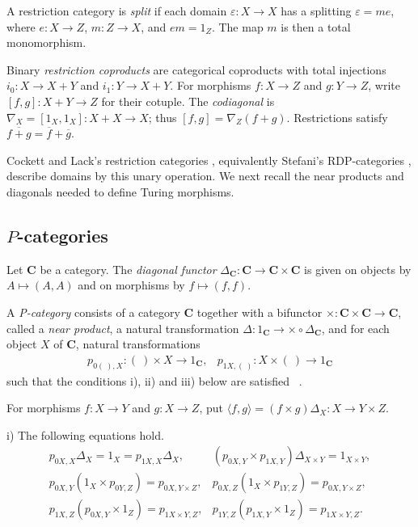 \documentclass[letterpaper,10pt]{amsart}
\theoremstyle{plain}
\theoremstyle{definition}
\newcommand{\MAP}[3]{{#1}:{#2}\rightarrow{#3}}
\newcommand{\sento}[2]{{#1}\mapsto{#2}}
\newcommand{\rst}[1]{\overline{#1}}
\begin{document}
A restriction category is \textit{split} if each domain
$\varepsilon:X\to X$ has a splitting $\varepsilon=me$, where
$e:X\to Z$, $m:Z\to X$, and $em=1_Z$. The map $m$ is then a
total monomorphism.

Binary \textit{restriction coproducts} are categorical coproducts with
total injections $i_0:X\to X+Y$ and $i_1:Y\to X+Y$. For morphisms
$f:X\to Z$ and $g:Y\to Z$, write $[f,g]:X+Y\to Z$ for their
cotuple. The \textit{codiagonal} is
$\nabla_X=[1_X,1_X]:X+X\to X$; thus $[f,g]=\nabla_Z(f+g)$.
Restrictions satisfy $\rst{f+g}=\rst f+\rst g$.

Cockett and Lack's restriction categories \cite{MR1871071,MR1963657},
equivalently Stefani's RDP-categories \cite{MR2003a:18003}, describe
domains by this unary operation. We next recall the near products and
diagonals needed to define Turing morphisms.

\subsection{\texorpdfstring{$P$}{P}-categories}
Let $\mathbf{C}$ be a category. The {\it diagonal functor}
$\MAP{\Delta_\mathbf{C}}{\mathbf C}{\mathbf{C}\times\mathbf{C}}$
is given on objects by $\sento{A}{(A,A)}$ and on morphisms by
$\sento{f}{(f,f)}$.

A {\it P-category} consists of a category $\mathbf{C}$ together
with a bifunctor $\MAP{\times}{\mathbf{C}\times\mathbf{C}}{\mathbf
C}$, called a {\it near product}, a natural transformation
$\MAP{\Delta}{1_\mathbf{C}}{\times\circ\Delta_{\mathbf C}}$, and
for each object $X$ of $\mathbf{C}$, natural transformations
\[
\begin{array}{ll}
p_{0 (\ ),X}:{(\ )\times X}\rightarrow{1_{\mathbf{C}}}, & 
p_{1 X, (\ )}:{X\times (\ ) }\rightarrow{1_{\mathbf{C}}}
\end{array}
\]
such that the conditions i), ii) and iii) below are satisfied ~\cite{coneit}.

For morphisms $f:X\to Y$ and $g:X\to Z$, put
$\langle f,g\rangle=(f\times g)\Delta_X:X\to Y\times Z$.

i) The following equations hold.
\[
\begin{array}{ll} %
p_{0 X,X}\Delta_X=1_X=p_{1 X, X}\Delta_X, & (p_{0 X,Y}\times
p_{1 X,Y})\Delta_{X\times Y}=1_{X\times Y},\\
p_{0 X,Y}(1_X\times p_{0 Y,Z})=p_{0 X,Y\times Z}, & p_{0
X,Z}(1_X\times p_{1 Y,Z})=p_{0 X,Y\times Z},\\
p_{1 X,Z}(p_{0 X,Y}\times 1_Z)=p_{1 X\times Y, Z}, & p_{1
Y,Z}(p_{1 X,Y}\times1_Z )=p_{1 X\times Y, Z}.
\end{array}
\]
\end{document}
